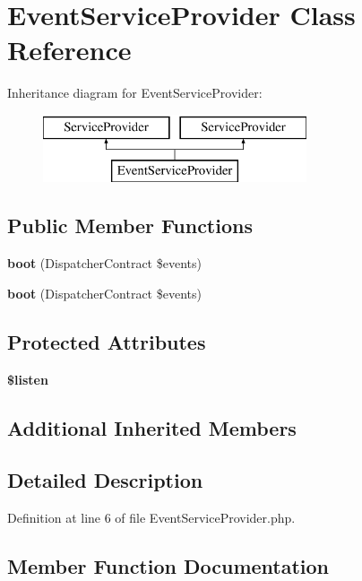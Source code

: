 \section{Event\+Service\+Provider Class Reference}
\label{class_app_1_1_providers_1_1_event_service_provider}
Inheritance diagram for Event\+Service\+Provider\+:\begin{figure}[H]
\begin{center}
\leavevmode
\includegraphics[height=2.000000cm]{class_app_1_1_providers_1_1_event_service_provider}
\end{center}
\end{figure}
\subsection*{Public Member Functions}
\begin{DoxyCompactItemize}
\item 
{\bf boot} (Dispatcher\+Contract \$events)
\item 
{\bf boot} (Dispatcher\+Contract \$events)
\end{DoxyCompactItemize}
\subsection*{Protected Attributes}
\begin{DoxyCompactItemize}
\item 
{\bf \$listen}
\end{DoxyCompactItemize}
\subsection*{Additional Inherited Members}


\subsection{Detailed Description}


Definition at line 6 of file Event\+Service\+Provider.\+php.



\subsection{Member Function Documentation}
